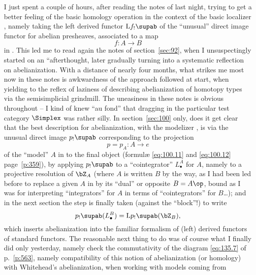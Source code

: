 \bigbreak

\presectionfill{}\par

\label{sec:136}%
I just spent a couple of hours, after reading the notes of last night,
trying to get a better feeling of the basic homology operation in the
context of the basic localizer \Cat, namely taking the left derived
functor $\mathrm Lf_!\supab$ of the ``unusual'' direct image functor
for abelian presheaves, associated to a map
\[f: A \to B\]
in \Cat. This led me to read again the notes of section~\ref{sec:92},
when I unsuspectingly started on an ``afterthought, later gradually
turning into a systematic reflection on abelianization. With a
distance of nearly four months, what strikes me most now in these
notes is awkwardness of the approach followed at start, when yielding
to the reflex of laziness of describing abelianization of homotopy
types via the semisimplicial grindmill. The uneasiness in these notes
is obvious throughout -- I kind of knew ``au fond'' that dragging in
the particular test category $\Simplex$ was rather silly. In
section~\ref{sec:100} only, does it get clear that the best
description for abelianization, with the modelizer \Cat, is via the
unusual direct image $p_!\supab$ corresponding to the projection
\[p=p_A:A\to e\]
of the ``model'' $A$ in \Cat{} to the final object (formulæ
\eqref{eq:100.11} and \eqref{eq:100.12} page~\ref{p:359}), by applying
$p_!\supab$ to a ``cointegrator'' $L_\bullet^A$ for $A$, namely to a
projective resolution of $\bZ_A$ (where $A$ is written $B$ by the way,
as I had been led before to replace a given $A$ in \Cat{} by its
``dual'' or opposite $B=A\op$, bound as I was for interpreting
``integrators'' for $A$ in terms of ``cointegrators'' for $B$\dots);
and in the next section the step is finally taken (against the
``block''!) to write
\[p_!\supab(L_\bullet^B)=\mathrm Lp_!\supab(\bZ_B),\]
which inserts abelianization into the familiar formalism of (left)
derived functors of standard functors. The reasonable next thing to do
was of course what I finally did only yesterday, namely check the
commutativity of the diagram \eqref{eq:135.7} of p.~\ref{p:563},
namely compatibility of this notion of abelianization (or homology)
with Whitehead's abelianization, when working with models coming from
